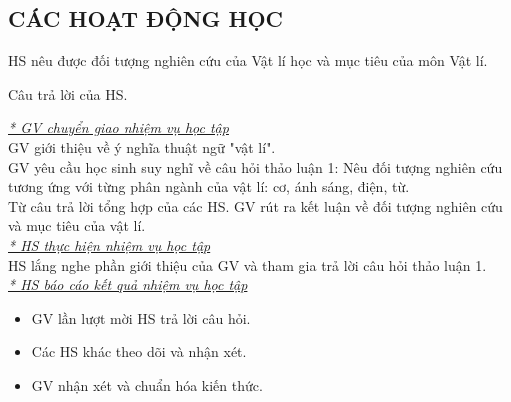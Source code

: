 \subsection{CÁC HOẠT ĐỘNG HỌC}
{HS nêu được đối tượng nghiên cứu của Vật lí học và mục tiêu của môn Vật lí.

}
{
Câu trả lời của HS.
}
{
\textit{\underline{* GV chuyển giao nhiệm vụ học tập}}\\
GV giới thiệu về ý nghĩa thuật ngữ "vật lí". \\
GV yêu cầu học sinh suy nghĩ về câu hỏi thảo luận 1: Nêu đối tượng nghiên cứu tương ứng với từng phân ngành của vật lí: cơ, ánh sáng, điện, từ.\\
Từ câu trả lời tổng hợp của các HS. GV rút ra kết luận về đối tượng nghiên cứu và mục tiêu của vật lí.\\
\textit{\underline{* HS thực hiện nhiệm vụ học tập}}\\
HS lắng nghe phần giới thiệu của GV và tham gia trả lời câu hỏi thảo luận 1.\\
\textit{\underline{* HS báo cáo kết quả nhiệm vụ học tập}}
\begin{itemize}[label=-]
	\item GV lần lượt mời HS trả lời câu hỏi.
	\item Các HS khác theo dõi và nhận xét.
	\item GV nhận xét và chuẩn hóa kiến thức.
\end{itemize}
}

